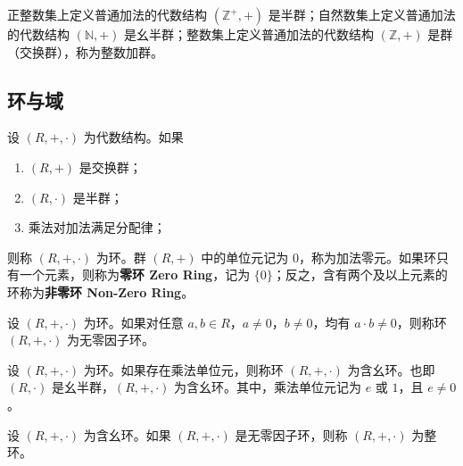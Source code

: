 \vspace{1em}

\begin{example}
    正整数集上定义普通加法的代数结构 $ ( \mathbb{Z}^+, +) $ 是半群；自然数集上定义普通加法的代数结构 $ (  \mathbb{N}, +) $ 是幺半群；整数集上定义普通加法的代数结构 $ ( \mathbb{Z}, +) $ 是群（交换群），称为整数加群。
\end{example}

\vspace{1em}

\subsection{环与域}

\begin{definition}[环 Ring]
    设 $ (R,+,\cdot) $ 为代数结构。如果
    \begin{enumerate}
        \item $ (R,+) $ 是交换群；
        \item $ (R,\cdot) $ 是半群；
        \item 乘法对加法满足分配律；
    \end{enumerate}
    则称 $ (R,+,\cdot) $ 为环。群 $ (R,+) $ 中的单位元记为 $0$，称为加法零元。如果环只有一个元素，则称为\textbf{零环 Zero Ring}，记为 $ \{0\} $；反之，含有两个及以上元素的环称为\textbf{非零环 Non-Zero Ring}。
\end{definition}
\vspace{1em}

\begin{definition}
    设 $ (R,+,\cdot) $ 为环。如果对任意 $ a,b\in R $，$ a\neq 0 $，$ b\neq 0 $，均有 $ a\cdot b \neq 0 $，则称环 $ (R,+,\cdot) $ 为无零因子环。
\end{definition}
\vspace{1em}

\begin{definition}
    设 $ (R,+,\cdot) $ 为环。如果存在乘法单位元，则称环 $ (R,+,\cdot) $ 为含幺环。也即 $(R,\cdot)$ 是幺半群，$ (R,+,\cdot) $ 为含幺环。其中，乘法单位元记为 $ e $ 或 $ 1 $，且 $ e\neq 0 $。
\end{definition}

\vspace{1em}

\begin{definition}
    设 $ (R,+,\cdot) $ 为含幺环。如果 $ (R,+,\cdot) $ 是无零因子环，则称 $ (R,+,\cdot) $ 为整环。
\end{definition}

